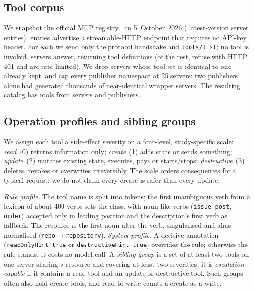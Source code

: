 \subsection{Tool corpus}
We snapshot the official MCP registry~\cite{mcpregistry} on 5~October~2026
(\NumRegistry{} latest-version server entries). \NumCandidates{} entries advertise a
streamable-HTTP endpoint that requires no API-key header. For each we send only the
protocol handshake and \texttt{tools/list}; no tool is invoked. \NumRespondingServers{} servers
answer, returning \NumRawTools{} tool definitions (of the rest, \NumFailAuth{} refuse with HTTP 401
and \NumFailRate{} are rate-limited). We drop servers whose tool set is identical to one already kept, and
cap every publisher namespace at 25 servers: two publishers alone had generated thousands of
near-identical wrapper servers. The resulting catalog has \NumCatTools{} tools from
\NumCatServers{} servers and \NumPublishers{} publishers.

\subsection{Operation profiles and sibling groups}
We assign each tool a side-effect severity on a four-level, study-specific scale:
\emph{read}~(0) returns information only; \emph{create}~(1) adds state or sends something;
\emph{update}~(2) mutates existing state, executes, pays or starts/stops; \emph{destructive}~(3)
deletes, revokes or overwrites irreversibly. The scale orders consequences for a typical request;
we do not claim every create is safer than every update.

\emph{Rule profile.} The tool name is split into tokens; the first unambiguous verb from a lexicon
of about 400 verbs sets the class, with noun-like verbs (\texttt{issue}, \texttt{post},
\texttt{order}) accepted only in leading position and the description's first verb as fallback.
The resource is the first noun after the verb, singularised and alias-normalised
(\texttt{repo}$\rightarrow$\texttt{repository}).
\emph{System profile.} A decisive annotation (\texttt{readOnlyHint=true} or
\texttt{destructiveHint=true}) overrides the rule; otherwise the rule stands. It costs no model
call.
A \emph{sibling group} is a set of at least two tools on one server sharing a resource and
covering at least two severities; it is \emph{escalation-capable} if it contains a read tool and
an update or destructive tool. Such groups often also hold create tools, and read-to-write counts a
create as a write.

